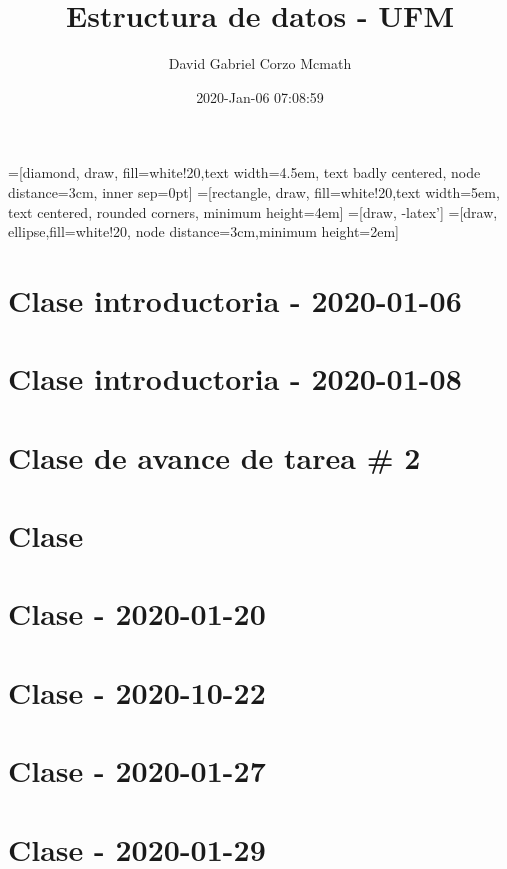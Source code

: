 \documentclass[openany]{book}
\title{Estructura de datos - UFM}
\author{David Gabriel Corzo Mcmath}
\date{2020-Jan-06 07:08:59}
\begin{document}
\maketitle
\tableofcontents

=[diamond, draw, fill=white!20,text width=4.5em, text badly centered, node distance=3cm, inner sep=0pt]
=[rectangle, draw, fill=white!20,text width=5em, text centered, rounded corners, minimum height=4em]
=[draw, -latex']
=[draw, ellipse,fill=white!20, node distance=3cm,minimum height=2em]


\chapter{Clase introductoria - 2020-01-06}


\chapter{Clase introductoria - 2020-01-08}


\chapter{Clase de avance de tarea \# 2}


\chapter{Clase }


\chapter{Clase - 2020-01-20}


\chapter{Clase - 2020-10-22}



\chapter{Clase - 2020-01-27}


\chapter{Clase - 2020-01-29}

\end{document}
